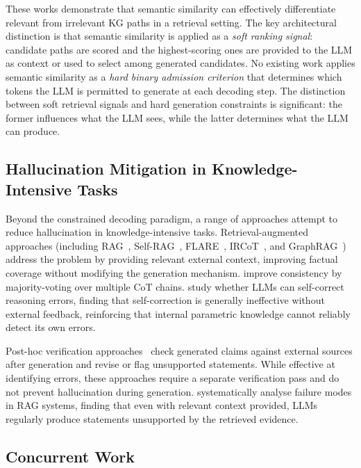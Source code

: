 These works demonstrate that semantic similarity can effectively differentiate relevant from irrelevant KG paths in a retrieval setting. The key architectural distinction is that semantic similarity is applied as a \textit{soft ranking signal}: candidate paths are scored and the highest-scoring ones are provided to the LLM as context or used to select among generated candidates. No existing work applies semantic similarity as a \textit{hard binary admission criterion} that determines which tokens the LLM is permitted to generate at each decoding step. The distinction between soft retrieval signals and hard generation constraints is significant: the former influences what the LLM sees, while the latter determines what the LLM can produce.

\subsection{Hallucination Mitigation in Knowledge-Intensive Tasks}

Beyond the constrained decoding paradigm, a range of approaches attempt to reduce hallucination in knowledge-intensive tasks. Retrieval-augmented approaches (including RAG~\citep{lewis2020rag}, Self-RAG~\citep{asai2024selfrag}, FLARE~\citep{jiang2023flare}, IRCoT~\citep{trivedi2022ircot}, and GraphRAG~\citep{edge2024graphrag}) address the problem by providing relevant external context, improving factual coverage without modifying the generation mechanism. \citet{wang2023selfconsistency} improve consistency by majority-voting over multiple CoT chains. \citet{huang2024selfcorrect} study whether LLMs can self-correct reasoning errors, finding that self-correction is generally ineffective without external feedback, reinforcing that internal parametric knowledge cannot reliably detect its own errors.

Post-hoc verification approaches~\citep{nakano2021webgpt, gao2023rarr} check generated claims against external sources after generation and revise or flag unsupported statements. While effective at identifying errors, these approaches require a separate verification pass and do not prevent hallucination during generation. \citet{agrawal2024mindful} systematically analyse failure modes in RAG systems, finding that even with relevant context provided, LLMs regularly produce statements unsupported by the retrieved evidence.

\subsection{Concurrent Work}

